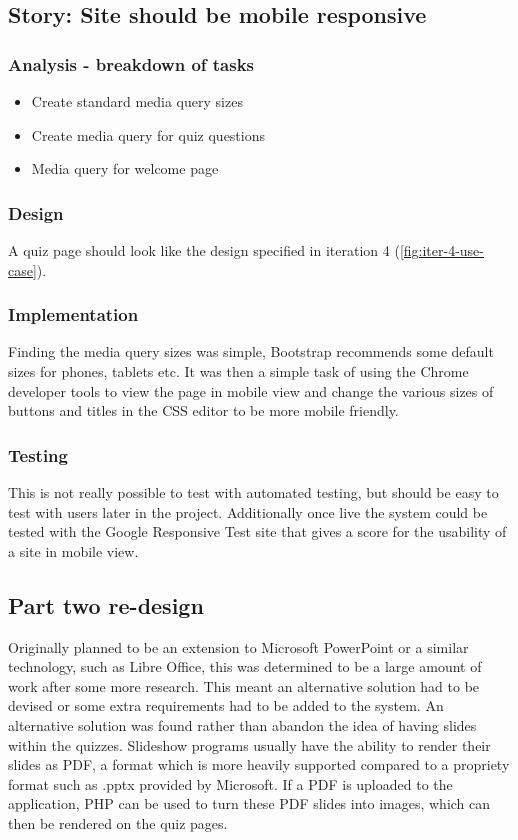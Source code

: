 \subsection{Story: Site should be mobile responsive}
\subsubsection{Analysis - breakdown of tasks}
\begin{itemize}
	\item Create standard media query sizes
	\item Create media query for quiz questions
	\item Media query for welcome page
\end{itemize}
\subsubsection{Design}
A quiz page should look like the design specified in iteration 4  (\ref{fig:iter-4-use-case}).
\subsubsection{Implementation}
Finding the media query sizes was simple, Bootstrap recommends some default sizes for phones, tablets etc\cite{bootstrap-media-queries}. It was then a simple task of using the Chrome developer tools to view the page in mobile view and change the various sizes of buttons and titles in the CSS editor to be more mobile friendly.
\subsubsection{Testing}
This is not really possible to test with automated testing, but should be easy to test with users later in the project. Additionally once live the system could be tested with the Google Responsive Test site that gives a score for the usability of a site in mobile view.
\newpage

\subsection{Part two re-design}
Originally planned to be an extension to Microsoft PowerPoint or a similar technology, such as Libre Office, this was determined to be a large amount of work after some more research. This meant an alternative solution had to be devised or some extra requirements had to be added to the system. An alternative solution was found rather than abandon the idea of having slides within the quizzes. Slideshow programs usually have the ability to render their slides as PDF, a format which is more heavily supported compared to a propriety format such as .pptx provided by Microsoft. If a PDF is uploaded to the application, PHP can be used to turn these PDF slides into images, which can then be rendered on the quiz pages.

